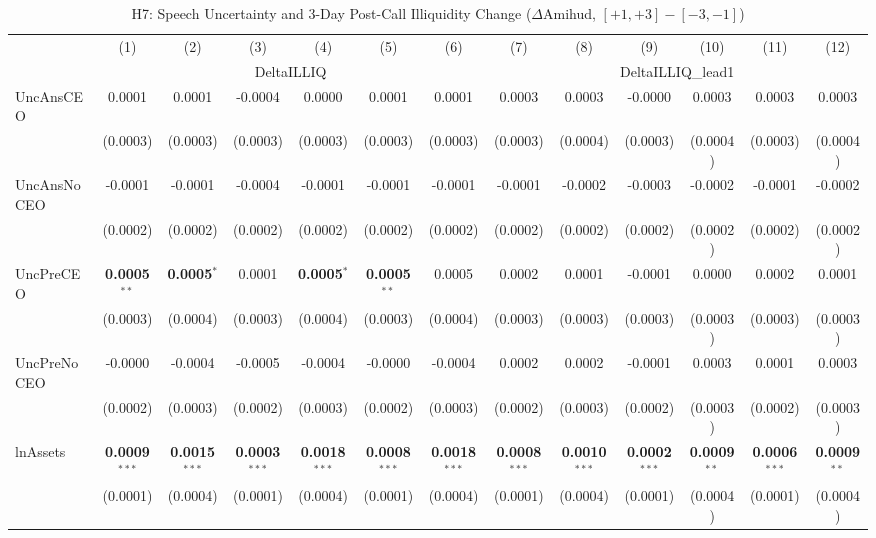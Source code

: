 \begin{landscape}
\begin{table}[H]
\setlength{\tabcolsep}{3pt}
\renewcommand{\arraystretch}{0.85}
\centering
\caption{H7: Speech Uncertainty and 3-Day Post-Call Illiquidity Change ($\Delta$Amihud, $[+1,+3]-[-3,-1]$)}
\label{tab:h7_robust}
\scriptsize
\begin{tabular}{lcccccccccccc}
\toprule
 & (1) & (2) & (3) & (4) & (5) & (6) & (7) & (8) & (9) & (10) & (11) & (12) \\
 & \multicolumn{6}{c}{DeltaILLIQ} & \multicolumn{6}{c}{DeltaILLIQ\_lead1} \\
\cmidrule(lr){2-7} \cmidrule(lr){8-13}
\midrule
UncAnsCEO & 0.0001 & 0.0001 & -0.0004 & 0.0000 & 0.0001 & 0.0001 & 0.0003 & 0.0003 & -0.0000 & 0.0003 & 0.0003 & 0.0003 \\
 & (0.0003) & (0.0003) & (0.0003) & (0.0003) & (0.0003) & (0.0003) & (0.0003) & (0.0004) & (0.0003) & (0.0004) & (0.0003) & (0.0004) \\
UncAnsNoCEO & -0.0001 & -0.0001 & -0.0004 & -0.0001 & -0.0001 & -0.0001 & -0.0001 & -0.0002 & -0.0003 & -0.0002 & -0.0001 & -0.0002 \\
 & (0.0002) & (0.0002) & (0.0002) & (0.0002) & (0.0002) & (0.0002) & (0.0002) & (0.0002) & (0.0002) & (0.0002) & (0.0002) & (0.0002) \\
UncPreCEO & \textbf{0.0005}$^{**}$ & \textbf{0.0005}$^{*}$ & 0.0001 & \textbf{0.0005}$^{*}$ & \textbf{0.0005}$^{**}$ & 0.0005 & 0.0002 & 0.0001 & -0.0001 & 0.0000 & 0.0002 & 0.0001 \\
 & (0.0003) & (0.0004) & (0.0003) & (0.0004) & (0.0003) & (0.0004) & (0.0003) & (0.0003) & (0.0003) & (0.0003) & (0.0003) & (0.0003) \\
UncPreNoCEO & -0.0000 & -0.0004 & -0.0005 & -0.0004 & -0.0000 & -0.0004 & 0.0002 & 0.0002 & -0.0001 & 0.0003 & 0.0001 & 0.0003 \\
 & (0.0002) & (0.0003) & (0.0002) & (0.0003) & (0.0002) & (0.0003) & (0.0002) & (0.0003) & (0.0002) & (0.0003) & (0.0002) & (0.0003) \\
\midrule
lnAssets & \textbf{0.0009}$^{***}$ & \textbf{0.0015}$^{***}$ & \textbf{0.0003}$^{***}$ & \textbf{0.0018}$^{***}$ & \textbf{0.0008}$^{***}$ & \textbf{0.0018}$^{***}$ & \textbf{0.0008}$^{***}$ & \textbf{0.0010}$^{***}$ & \textbf{0.0002}$^{***}$ & \textbf{0.0009}$^{**}$ & \textbf{0.0006}$^{***}$ & \textbf{0.0009}$^{**}$ \\
 & (0.0001) & (0.0004) & (0.0001) & (0.0004) & (0.0001) & (0.0004) & (0.0001) & (0.0004) & (0.0001) & (0.0004) & (0.0001) & (0.0004) \\

\end{tabular}
\end{table}
\end{landscape}
